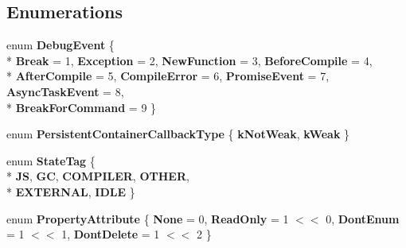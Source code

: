 \subsection*{Enumerations}
\begin{DoxyCompactItemize}
\item 
\hypertarget{namespacev8_a4157e857c3767e2b82686a53ae3da853}{}enum {\bfseries Debug\+Event} \{ \\*
{\bfseries Break} = 1, 
{\bfseries Exception} = 2, 
{\bfseries New\+Function} = 3, 
{\bfseries Before\+Compile} = 4, 
\\*
{\bfseries After\+Compile} = 5, 
{\bfseries Compile\+Error} = 6, 
{\bfseries Promise\+Event} = 7, 
{\bfseries Async\+Task\+Event} = 8, 
\\*
{\bfseries Break\+For\+Command} = 9
 \}\label{namespacev8_a4157e857c3767e2b82686a53ae3da853}

\item 
\hypertarget{namespacev8_ad2a33b8f8a1701a800a691dd025f7dde}{}enum {\bfseries Persistent\+Container\+Callback\+Type} \{ {\bfseries k\+Not\+Weak}, 
{\bfseries k\+Weak}
 \}\label{namespacev8_ad2a33b8f8a1701a800a691dd025f7dde}

\item 
\hypertarget{namespacev8_adb1bd0f9ef7cc084b6a94a5e1b420f69}{}enum {\bfseries State\+Tag} \{ \\*
{\bfseries J\+S}, 
{\bfseries G\+C}, 
{\bfseries C\+O\+M\+P\+I\+L\+E\+R}, 
{\bfseries O\+T\+H\+E\+R}, 
\\*
{\bfseries E\+X\+T\+E\+R\+N\+A\+L}, 
{\bfseries I\+D\+L\+E}
 \}\label{namespacev8_adb1bd0f9ef7cc084b6a94a5e1b420f69}

\item 
\hypertarget{namespacev8_a05f25f935e108a1ea2d150e274602b87}{}enum {\bfseries Property\+Attribute} \{ {\bfseries None} = 0, 
{\bfseries Read\+Only} = 1 $<$$<$ 0, 
{\bfseries Dont\+Enum} = 1 $<$$<$ 1, 
{\bfseries Dont\+Delete} = 1 $<$$<$ 2
 \}\label{namespacev8_a05f25f935e108a1ea2d150e274602b87}


\end{DoxyCompactItemize}

